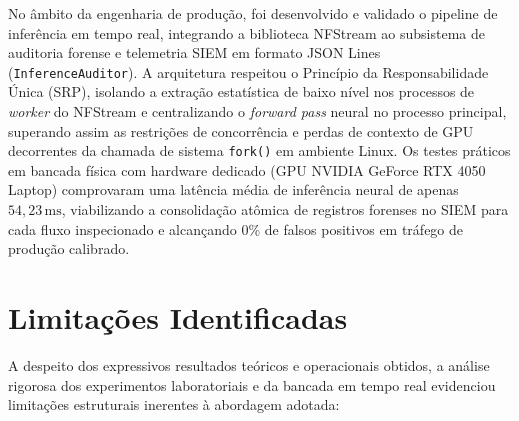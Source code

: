 No âmbito da engenharia de produção, foi desenvolvido e validado o pipeline de inferência em tempo real, integrando a biblioteca NFStream ao subsistema de auditoria forense e telemetria SIEM em formato JSON Lines (\texttt{InferenceAuditor}). A arquitetura respeitou o Princípio da Responsabilidade Única (SRP), isolando a extração estatística de baixo nível nos processos de \emph{worker} do NFStream e centralizando o \emph{forward pass} neural no processo principal, superando assim as restrições de concorrência e perdas de contexto de GPU decorrentes da chamada de sistema \texttt{fork()} em ambiente Linux. Os testes práticos em bancada física com hardware dedicado (GPU NVIDIA GeForce RTX 4050 Laptop) comprovaram uma latência média de inferência neural de apenas $54{,}23\,\mathrm{ms}$, viabilizando a consolidação atômica de registros forenses no SIEM para cada fluxo inspecionado e alcançando 0\% de falsos positivos em tráfego de produção calibrado.


\section{Limitações Identificadas}
\label{sec:limitacoes_identificadas}

A despeito dos expressivos resultados teóricos e operacionais obtidos, a análise rigorosa dos experimentos laboratoriais e da bancada em tempo real evidenciou limitações estruturais inerentes à abordagem adotada:

